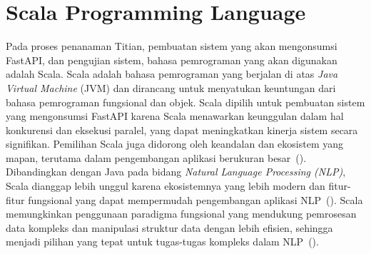 \section{Scala Programming Language}
Pada proses penanaman Titian, pembuatan sistem yang akan 
mengonsumsi FastAPI, dan pengujian sistem,
bahasa pemrograman yang akan digunakan adalah Scala. 
Scala adalah bahasa pemrograman yang berjalan di atas
\emph{Java Virtual Machine} (JVM) dan dirancang untuk menyatukan
keuntungan dari bahasa pemrograman fungsional dan objek.
Scala dipilih untuk pembuatan sistem yang mengonsumsi FastAPI 
karena Scala menawarkan keunggulan dalam hal konkurensi dan 
eksekusi paralel, yang dapat meningkatkan kinerja sistem secara 
signifikan. Pemilihan Scala juga didorong oleh keandalan dan 
ekosistem yang mapan, terutama dalam pengembangan aplikasi 
berukuran besar~(\cite{laddad2020}). Dibandingkan dengan Java 
pada bidang \emph{Natural Language Processing (NLP)}, Scala 
dianggap lebih unggul karena ekosistemnya yang lebih modern 
dan fitur-fitur fungsional yang dapat mempermudah pengembangan 
aplikasi NLP~(\cite{pankratius2012}). Scala memungkinkan 
penggunaan paradigma fungsional yang mendukung pemrosesan 
data kompleks dan manipulasi struktur data dengan lebih 
efisien, sehingga menjadi pilihan yang tepat untuk tugas-tugas 
kompleks dalam NLP~(\cite{papadimitriou2011}).